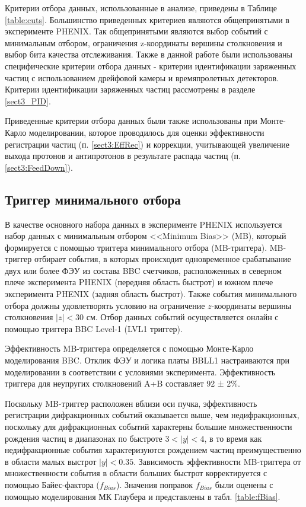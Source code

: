 Критерии отбора данных, использованные в анализе, приведены в Таблице \ref{table:cuts}. Большинство приведенных критериев являются общепринятыми в эксперименте PHENIX. Так общепринятыми являются  выбор событий с минимальным отбором, ограничения z-координаты вершины столкновения и выбор бита качества отслеживания. Также в данной работе были использованы специфические критерии отбора данных -  критерии идентификации заряженных частиц с использованием дрейфовой камеры и времяпролетных детекторов. Критерии идентификации заряженных частиц рассмотрены в разделе \ref{sect3_PID}.

Приведенные критерии отбора данных были также использованы при Монте-Карло моделировании, которое проводилось для оценки эффективности регистрации частиц (п. \ref{sect3:EffRec}) и коррекции, учитывающей увеличение выхода протонов и антипротонов в результате распада частиц (п. \ref{sect3:FeedDown}). 

\subsection{Триггер минимального отбора}
В качестве основного набора данных в эксперименте PHENIX используется набор данных с минимальным отбором <<Minimum Bias>> (MB), который формируется с помощью триггера минимального отбора (MB-триггера).
MB-триггер отбирает события, в которых происходит одновременное срабатывание двух или более ФЭУ из состава BBC счетчиков, расположенных в северном плече эксперимента PHENIX (передняя область быстрот) и южном плече эксперимента PHENIX (задняя область быстрот).
Также события минимального отбора должны удовлетворять условию на ограничение $z$-координаты вершины столкновения $|z| < $30 см. Отбор данных событий осуществляется онлайн с помощью триггера BBC Level-1 (LVL1 триггер).

Эффективность MB-триггера определяется с помощью Монте-Карло моделирования BBC. Отклик ФЭУ и логика платы BBLL1 настраиваются при моделировании в соответствии с условиями эксперимента. Эффективность триггера для неупругих столкновений A+B составляет 92 ± 2\%. 

Поскольку MB-триггер расположен вблизи оси пучка, эффективность регистрации дифракционных событий оказывается выше, чем недифракционных, поскольку для дифракционных событий характерны большие множественности рождения частиц в диапазонах по быстроте $3 <|y|<4$, в то время как недифракционные события характеризуются рождением частиц преимущественно в области малых выстрот $|y|<0.35$. Зависимость эффективности MB-триггера от множественности события в области больших быстрот корректируется с помощью Байес-фактора ($f_{Bias}$). 
Значения поправок $f_{Bias}$ были оценены с помощью моделирования МК Глаубера и представлены в табл. \ref{table:fBias}.

